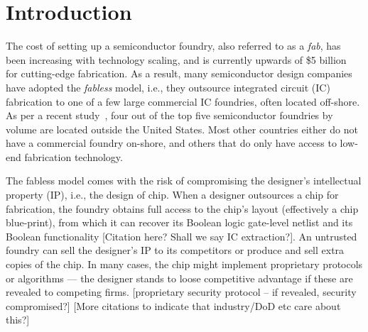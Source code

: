 \section{Introduction}

The cost of setting up a semiconductor foundry, also referred to 
as a \emph{fab}, 
has been increasing with technology scaling, and is 
currently upwards of \$5 billion~\cite{FoundryCost} for 
cutting-edge fabrication.
As a result, 
many semiconductor design companies have 
adopted the \textit{fabless} model, i.e., they outsource integrated circuit (IC) fabrication to one of a few large commercial IC foundries, often located off-shore. 
As per a recent study~\cite{}, 
four out of the 
top five semiconductor foundries by 
volume are located outside the United States. Most other countries  
either do not have a commercial 
foundry on-shore, and others that do only have access to low-end fabrication technology.  

The fabless model comes with the risk of compromising the 
designer's intellectual property (IP), i.e., the design of chip. 
When a designer outsources a chip for fabrication, the 
foundry obtains full access 
to the chip's layout (effectively a chip blue-print), 
from which it can 
recover its Boolean logic gate-level 
netlist and its 
Boolean 
functionality 
[Citation here? Shall we say IC extraction?]. 
An untrusted 
foundry can sell the designer's IP 
to its competitors or produce and sell extra copies of the 
chip. 
In many cases, the chip might implement proprietary 
protocols or algorithms --- the designer stands to loose competitive 
advantage if these are revealed to competing firms. 
[proprietary security protocol -- if revealed, security compromised?] 
[More citations to indicate that industry/DoD etc care about this?]  



